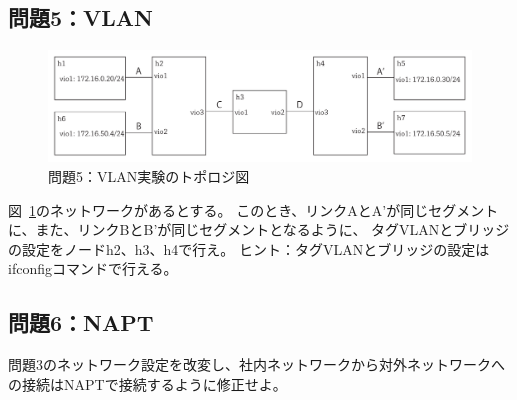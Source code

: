 \subsection{問題5：VLAN}

\begin{figure}
    \centering
    \includegraphics[width=15cm,pagebox=artbox]{figs/quiz05.pdf}
    \caption{問題5：VLAN実験のトポロジ図} \label{fig:quiz05}
\end{figure}

図~\ref{fig:quiz05}のネットワークがあるとする。
このとき、リンクAとA'が同じセグメントに、また、リンクBとB'が同じセグメントとなるように、
タグVLANとブリッジの設定をノードh2、h3、h4で行え。
ヒント：タグVLANとブリッジの設定はifconfigコマンドで行える。

\subsection{問題6：NAPT}

問題3のネットワーク設定を改変し、社内ネットワークから対外ネットワークへの接続はNAPTで接続するように修正せよ。